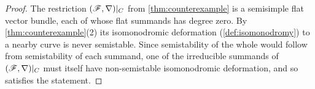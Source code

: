 \begin{proof}
  The restriction \((\mathscr{F}, \nabla)|_C\) from \cref{thm:counterexample} is a
  semisimple flat vector bundle, each of whose flat summands has degree zero. By
  \cref{thm:counterexample}(2) its isomonodromic deformation
  (\cref{def:isomonodromy}) to a nearby curve is never semistable. Since
  semistability of the whole would follow from semistability of each summand, one
  of the irreducible summands of \((\mathscr{F}, \nabla)|_C\) must itself have
  non-semistable isomonodromic deformation, and so satisfies the statement.
\end{proof}
